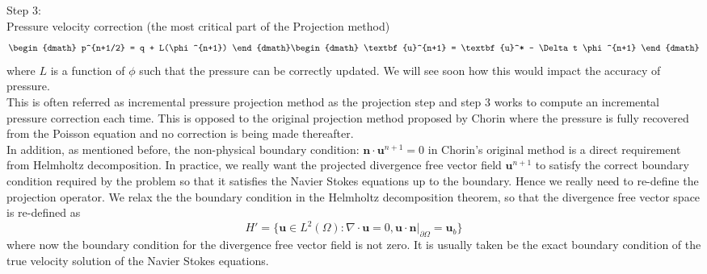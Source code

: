 Step 3:\\
Pressure velocity correction (the most critical part of the Projection method)
\begin{dgroup}
\begin{dmath}
p^{n+1/2} = q + L(\phi^{n+1})
\end{dmath}
\begin{dmath}
\textbf{u}^{n+1} = \textbf{u}^* - \Delta t \phi^{n+1}
\end{dmath}
\end{dgroup}
where $\textit{L}$ is a function of $\phi$ such that the pressure can be correctly updated. We will see soon how this would impact the accuracy of pressure.\\


This is often referred as incremental pressure projection method \cite{brown2001accurate} as the projection step and step 3 works to compute an incremental pressure correction each time. This is opposed to the original projection method proposed by Chorin where the pressure is fully recovered from the Poisson equation and no correction is being made thereafter.\\

In addition, as mentioned before, the non-physical boundary condition: $\textbf{n}\cdot\textbf{u}^{n+1} = 0$ in Chorin's original method is a direct requirement from Helmholtz decomposition. In practice, we really want the projected divergence free vector field $\textbf{u}^{n+1}$ to satisfy the correct boundary condition required by the problem so that it satisfies the Navier Stokes equations up to the boundary. Hence we really need to re-define the projection operator. We relax the the boundary condition in the Helmholtz decomposition theorem, so that the divergence free vector space is re-defined as 
\begin{equation*}
H' = \lbrace {\textbf{u} \in \textit{L}^2 (\Omega): \nabla \cdot \textbf{u} = 0, \textbf{u} \cdot \textbf{n} |_{\partial \Omega} = \textbf{u}_b} \rbrace 
\end{equation*}
where now the boundary condition for the divergence free vector field is not zero. It is usually taken be the exact boundary condition of the true velocity solution of the Navier Stokes equations.\\

